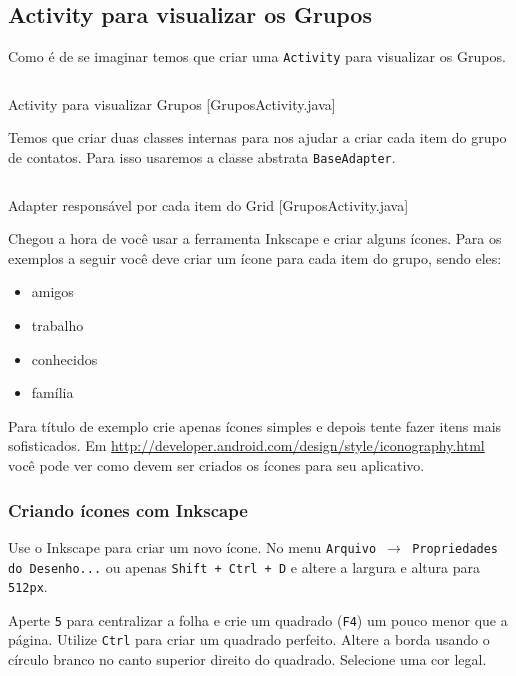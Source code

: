 \subsection{Activity para visualizar os Grupos}

Como é de se imaginar temos que criar uma \texttt{Activity} para visualizar os Grupos.

\begin{listing}[H]
  \inputminted[linenos=true,frame=bottomline,tabsize=3]{ java }{ source/GruposActivity-1.java }
  \caption{Activity para visualizar Grupos [GruposActivity.java]}
\end{listing}

Temos que criar duas classes internas para nos ajudar a criar cada item do grupo de contatos.
Para isso usaremos a classe abstrata \texttt{BaseAdapter}.

\begin{listing}[H]
  \inputminted[linenos=true,frame=bottomline,tabsize=3]{ java }{ source/GruposActivity-2.java }
  \caption{Adapter responsável por cada item do Grid [GruposActivity.java]}
\end{listing}

Chegou a hora de você usar a ferramenta Inkscape e criar alguns ícones. Para os exemplos a seguir
você deve criar um ícone para cada item do grupo, sendo eles:

\begin{itemize}
	\item amigos
	\item trabalho
	\item conhecidos
	\item família
\end{itemize}

Para título de exemplo crie apenas ícones simples e depois tente fazer itens mais sofisticados. Em
\url{http://developer.android.com/design/style/iconography.html} você pode ver como devem ser criados
os ícones para seu aplicativo.

\subsubsection{Criando ícones com Inkscape}

Use o Inkscape para criar um novo ícone. No menu \texttt{Arquivo $\rightarrow$
Propriedades do Desenho...} ou apenas \texttt{Shift + Ctrl + D} e altere a largura e altura
para \texttt{512px}.

Aperte \texttt{5} para centralizar a folha e crie um quadrado (\texttt{F4}) um pouco menor que a página.
Utilize \texttt{Ctrl} para criar um quadrado perfeito. Altere a borda usando o círculo branco no canto
superior direito do quadrado. Selecione uma cor legal.

